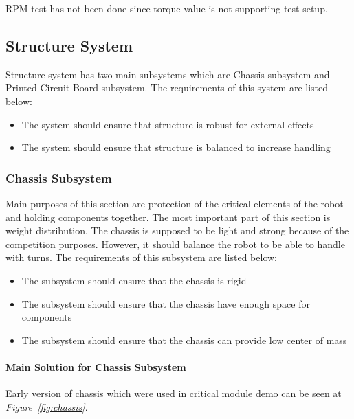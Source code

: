 \documentclass[a4paper,12pt]{article}
\begin{document}
	RPM test has not been done since torque value is not supporting test setup.
	\subsection{Structure System}
	
	Structure system has two main subsystems which are Chassis subsystem and Printed Circuit Board subsystem. The requirements of this system are listed below:
	\begin{itemize}
		\item The system should	ensure that structure is robust for external effects 
		\item The system should	ensure that structure is balanced to increase handling
		
	\end{itemize}
	
	
	
	\subsubsection{Chassis Subsystem}
	Main purposes of this section are protection of the critical elements of the robot and holding components together. The most important part of this section is weight distribution. The chassis is supposed to be light and strong because of the competition purposes. However, it should balance the robot to be able to handle with turns. The requirements of this subsystem are listed below:
	\begin{itemize}
		\item The subsystem should ensure that the chassis is rigid 
		\item The subsystem should ensure that the chassis have enough space for components
		\item The subsystem should ensure that the chassis can provide low center of mass 
	\end{itemize}
	
	\paragraph{Main Solution for Chassis Subsystem}
	
	Early version of chassis which were used in critical module demo can be seen at \textit{Figure~\ref{fig:chassis}}. 
	
	
\end{document}

